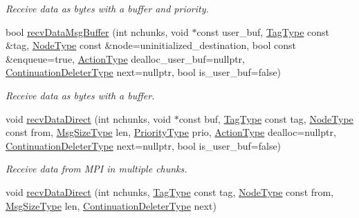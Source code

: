 \begin{DoxyCompactItemize}
\begin{DoxyCompactList}\small\item\em Receive data as bytes with a buffer and priority. \end{DoxyCompactList}\item 
bool \hyperlink{structvt_1_1messaging_1_1_active_messenger_a48518ecdb0ae882a36994dddd8f3eef8}{recv\+Data\+Msg\+Buffer} (int nchunks, void $\ast$const user\+\_\+buf, \hyperlink{namespacevt_a84ab281dae04a52a4b243d6bf62d0e52}{Tag\+Type} const \&tag, \hyperlink{namespacevt_a866da9d0efc19c0a1ce79e9e492f47e2}{Node\+Type} const \&node=uninitialized\+\_\+destination, bool const \&enqueue=true, \hyperlink{namespacevt_ae0a5a7b18cc99d7b732cb4d44f46b0f3}{Action\+Type} dealloc\+\_\+user\+\_\+buf=nullptr, \hyperlink{namespacevt_a6de3bd201e2a040be9362d9d24d1e446}{Continuation\+Deleter\+Type} next=nullptr, bool is\+\_\+user\+\_\+buf=false)
\begin{DoxyCompactList}\small\item\em Receive data as bytes with a buffer. \end{DoxyCompactList}\item 
void \hyperlink{structvt_1_1messaging_1_1_active_messenger_a030dfbfd95be050b71eea091d07bd66a}{recv\+Data\+Direct} (int nchunks, void $\ast$const buf, \hyperlink{namespacevt_a84ab281dae04a52a4b243d6bf62d0e52}{Tag\+Type} const tag, \hyperlink{namespacevt_a866da9d0efc19c0a1ce79e9e492f47e2}{Node\+Type} const from, \hyperlink{namespacevt_a408e86a8c7c89309b52907dc5a513924}{Msg\+Size\+Type} len, \hyperlink{namespacevt_a86bff9f556eb761b27fc8600d006ac04}{Priority\+Type} prio, \hyperlink{namespacevt_ae0a5a7b18cc99d7b732cb4d44f46b0f3}{Action\+Type} dealloc=nullptr, \hyperlink{namespacevt_a6de3bd201e2a040be9362d9d24d1e446}{Continuation\+Deleter\+Type} next=nullptr, bool is\+\_\+user\+\_\+buf=false)
\begin{DoxyCompactList}\small\item\em Receive data from M\+PI in multiple chunks. \end{DoxyCompactList}\item 
void \hyperlink{structvt_1_1messaging_1_1_active_messenger_a978662aef65c15652448619d7c58dadc}{recv\+Data\+Direct} (int nchunks, \hyperlink{namespacevt_a84ab281dae04a52a4b243d6bf62d0e52}{Tag\+Type} const tag, \hyperlink{namespacevt_a866da9d0efc19c0a1ce79e9e492f47e2}{Node\+Type} const from, \hyperlink{namespacevt_a408e86a8c7c89309b52907dc5a513924}{Msg\+Size\+Type} len, \hyperlink{namespacevt_a6de3bd201e2a040be9362d9d24d1e446}{Continuation\+Deleter\+Type} next)

\end{DoxyCompactItemize}
